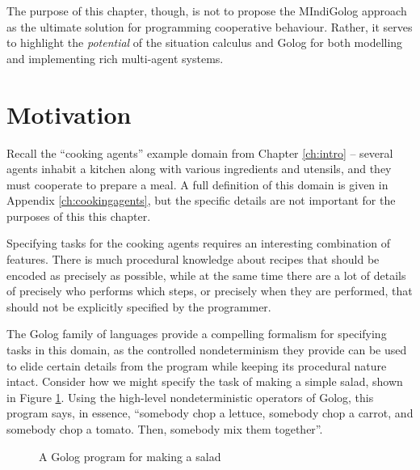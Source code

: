 The purpose of this chapter, though, is not to propose the MIndiGolog
approach as the ultimate solution for programming cooperative behaviour.
Rather, it serves to highlight the \emph{potential} of the situation
calculus and Golog for both modelling and implementing rich multi-agent
systems.


\section{Motivation\label{sec:MIndiGolog:Motivation}}

Recall the {}``cooking agents'' example domain from Chapter \ref{ch:intro}
-- several agents inhabit a kitchen along with various ingredients
and utensils, and they must cooperate to prepare a meal. A full definition
of this domain is given in Appendix \ref{ch:cookingagents}, but the
specific details are not important for the purposes of this this chapter.

Specifying tasks for the cooking agents requires an interesting combination
of features. There is much procedural knowledge about recipes that
should be encoded as precisely as possible, while at the same time
there are a lot of details of precisely who performs which steps,
or precisely when they are performed, that should not be explicitly
specified by the programmer.

The Golog family of languages provide a compelling formalism for specifying
tasks in this domain, as the controlled nondeterminism they provide
can be used to elide certain details from the program while keeping
its procedural nature intact. Consider how we might specify the task
of making a simple salad, shown in Figure \ref{fig:MIndiGolog:MakeSalad}.
Using the high-level nondeterministic operators of Golog, this program
says, in essence, {}``somebody chop a lettuce, somebody chop a carrot,
and somebody chop a tomato. Then, somebody mix them together''.

%
\begin{figure}[!t]
\begin{centering}
\par\end{centering}

\caption{A Golog program for making a salad\label{fig:MIndiGolog:MakeSalad}}

\end{figure}


